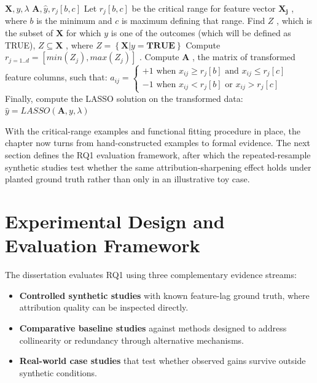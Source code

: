 \begin{algorithm}
	\caption{Critical-Range Rectification and Sparse Baseline Fitting}
	\begin{algorithmic}[1] %
		\Require $ \mathbf{X},y,\lambda $
		\Ensure $ \mathbf{A},\hat{y},r_j \left[b,c\right] $
		\State Let $ r_j \left[b,c\right] $ be the critical range for feature vector $ \mathbf{X_j} $ , where $ b $ is the minimum and $ c $ is maximum defining that range.
		\State Find $ Z $ , which is the subset of $ \mathbf{X} $ for which $ y $ is one of the outcomes (which will be defined as TRUE),  $ Z \subseteq \mathbf{X} $ , where $ Z = \left\{ \mathbf{X} \vert y = \mathbf{TRUE} \right\} $
		\State Compute $ r_{j=1..d} = \left[ min(Z_j), max(Z_j) \right] $ . 
		\State Compute $ \mathbf{A} $ , the matrix of transformed feature columns, such that:
		\Statex $ a_{ij} = 
		\begin{cases}
			+1 \text{ when } x_{ij} \geq r_j[b] \text{ and } x_{ij} \leq r_j[c] \\
			-1 \text{ when } x_{ij} < r_j[b] \text{ or } x_{ij} > r_j[c]
		\end{cases}
		$
		\EndProcedure
		\State Finally, compute the LASSO solution on the transformed data:
		\Statex $ \hat{y} = LASSO(\mathbf{A},y,\lambda) $
	\end{algorithmic}
	\label{alg:binarization}
\end{algorithm}

With the critical-range examples and functional fitting procedure in place, the chapter now turns from hand-constructed examples to formal evidence. The next section defines the RQ1 evaluation framework, after which the repeated-resample synthetic studies test whether the same attribution-sharpening effect holds under planted ground truth rather than only in an illustrative toy case.

\section{Experimental Design and Evaluation Framework}

The dissertation evaluates RQ1 using three complementary evidence streams:
\begin{itemize}
    \item \textbf{Controlled synthetic studies} with known feature-lag ground truth, where attribution quality can be inspected directly.
    \item \textbf{Comparative baseline studies} against methods designed to address collinearity or redundancy through alternative mechanisms.
    \item \textbf{Real-world case studies} that test whether observed gains survive outside synthetic conditions.
\end{itemize}

